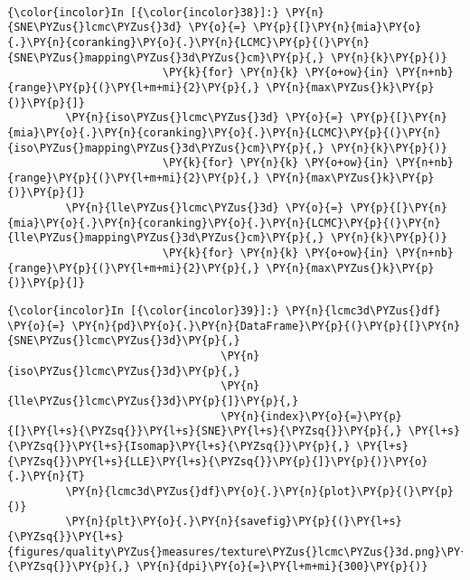     \begin{center}
    \end{center}
    { \hspace*{\fill} \\}

    \begin{Verbatim}[commandchars=\\\{\}]
{\color{incolor}In [{\color{incolor}38}]:} \PY{n}{SNE\PYZus{}lcmc\PYZus{}3d} \PY{o}{=} \PY{p}{[}\PY{n}{mia}\PY{o}{.}\PY{n}{coranking}\PY{o}{.}\PY{n}{LCMC}\PY{p}{(}\PY{n}{SNE\PYZus{}mapping\PYZus{}3d\PYZus{}cm}\PY{p}{,} \PY{n}{k}\PY{p}{)}
                        \PY{k}{for} \PY{n}{k} \PY{o+ow}{in} \PY{n+nb}{range}\PY{p}{(}\PY{l+m+mi}{2}\PY{p}{,} \PY{n}{max\PYZus{}k}\PY{p}{)}\PY{p}{]}
         \PY{n}{iso\PYZus{}lcmc\PYZus{}3d} \PY{o}{=} \PY{p}{[}\PY{n}{mia}\PY{o}{.}\PY{n}{coranking}\PY{o}{.}\PY{n}{LCMC}\PY{p}{(}\PY{n}{iso\PYZus{}mapping\PYZus{}3d\PYZus{}cm}\PY{p}{,} \PY{n}{k}\PY{p}{)}
                        \PY{k}{for} \PY{n}{k} \PY{o+ow}{in} \PY{n+nb}{range}\PY{p}{(}\PY{l+m+mi}{2}\PY{p}{,} \PY{n}{max\PYZus{}k}\PY{p}{)}\PY{p}{]}
         \PY{n}{lle\PYZus{}lcmc\PYZus{}3d} \PY{o}{=} \PY{p}{[}\PY{n}{mia}\PY{o}{.}\PY{n}{coranking}\PY{o}{.}\PY{n}{LCMC}\PY{p}{(}\PY{n}{lle\PYZus{}mapping\PYZus{}3d\PYZus{}cm}\PY{p}{,} \PY{n}{k}\PY{p}{)}
                        \PY{k}{for} \PY{n}{k} \PY{o+ow}{in} \PY{n+nb}{range}\PY{p}{(}\PY{l+m+mi}{2}\PY{p}{,} \PY{n}{max\PYZus{}k}\PY{p}{)}\PY{p}{]}
\end{Verbatim}

    \begin{Verbatim}[commandchars=\\\{\}]
{\color{incolor}In [{\color{incolor}39}]:} \PY{n}{lcmc3d\PYZus{}df} \PY{o}{=} \PY{n}{pd}\PY{o}{.}\PY{n}{DataFrame}\PY{p}{(}\PY{p}{[}\PY{n}{SNE\PYZus{}lcmc\PYZus{}3d}\PY{p}{,}
                                 \PY{n}{iso\PYZus{}lcmc\PYZus{}3d}\PY{p}{,}
                                 \PY{n}{lle\PYZus{}lcmc\PYZus{}3d}\PY{p}{]}\PY{p}{,}
                                 \PY{n}{index}\PY{o}{=}\PY{p}{[}\PY{l+s}{\PYZsq{}}\PY{l+s}{SNE}\PY{l+s}{\PYZsq{}}\PY{p}{,} \PY{l+s}{\PYZsq{}}\PY{l+s}{Isomap}\PY{l+s}{\PYZsq{}}\PY{p}{,} \PY{l+s}{\PYZsq{}}\PY{l+s}{LLE}\PY{l+s}{\PYZsq{}}\PY{p}{]}\PY{p}{)}\PY{o}{.}\PY{n}{T}
         \PY{n}{lcmc3d\PYZus{}df}\PY{o}{.}\PY{n}{plot}\PY{p}{(}\PY{p}{)}
         \PY{n}{plt}\PY{o}{.}\PY{n}{savefig}\PY{p}{(}\PY{l+s}{\PYZsq{}}\PY{l+s}{figures/quality\PYZus{}measures/texture\PYZus{}lcmc\PYZus{}3d.png}\PY{l+s}{\PYZsq{}}\PY{p}{,} \PY{n}{dpi}\PY{o}{=}\PY{l+m+mi}{300}\PY{p}{)}
\end{Verbatim}

